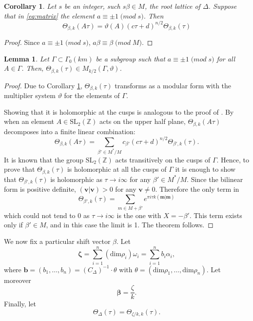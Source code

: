 \documentclass[11pt,a4paper]{amsart}
\newtheorem{lemma}[theorem]{Lemma}
\newtheorem{corollary}[theorem]{Corollary}
\theoremstyle{definition}
\newcommand{\SZ}{\mathbb{Z}}                    %
\begin{document}
\begin{corollary}
\label{cor:mult} Let $s$ be an integer, such $s\beta \in M$, the root lattice of $\Delta$.
Suppose that in \eqref{eq:matrix} the element $a \equiv \pm 1 \; \mathrm(mod\; s)$.
Then 
\[ \Theta_{\beta,k}(A\tau)= \vartheta(A)(c\tau+d)^{n/2} \Theta_{\beta,k}(\tau) \]
\end{corollary}
\begin{proof}
Since $a \equiv \pm 1 \; \mathrm(mod\; s)$, $a \beta \equiv \beta \; \mathrm(mod\; M)$.
\end{proof}
\begin{lemma} 
\label{lem:mult2}
Let $\Gamma \subset \Gamma_0(km)$ be a subgroup such that $a \equiv \pm 1 \; \mathrm(mod\; s)$ for all $A \in \Gamma$. Then, $\Theta_{\beta,k}(\tau) \in M_{k/2}(\Gamma, \vartheta)$.
\end{lemma}
\begin{proof} Due to Corollary \ref{cor:mult}, $\Theta_{\beta,k}(\tau)$ transforms as a modular form with the multiplier system $\vartheta$ for the elements of $\Gamma$. 

Showing that it is holomorphic at the cusps is analogous to the proof of \cite[Corollary 14.3.16]{cohen2017modular}. By \cite[Theorem 14.3.7]{cohen2017modular} when an element $A \in \textrm{SL}_2(\SZ)$ acts on the upper half plane, $\Theta_{\beta,k}(A\tau)$ decomposes into a finite linear combination:
\[ \Theta_{\beta,k}(A\tau)=\sum_{\beta' \in M^{\ast}/M}c_{\beta'}(c\tau+d)^{n/2}\Theta_{\beta',k}(\tau). \]
It is known that the group $\textrm{SL}_2(\SZ)$ acts transitively on the cusps of $\Gamma$.  Hence, to prove that $\Theta_{\beta,k}(\tau)$ is holomorphic at all the cusps of $\Gamma$ it is enough to show that $\Theta_{\beta',k}(\tau)$ is holomorphic as $\tau \to i\infty$ for any $\beta' \in M^{\ast}/M$. Since the bilinear form is positive definite, $(\mathbf{v}|\mathbf{v})>0$ for any $\mathbf{v} \neq 0$. Therefore the only term in
\[\Theta_{\beta',k}(\tau)= \sum_{m \in M+\beta'} e^{\pi i \tau k (\mathbf{m} | \mathbf{m})}\]
which could not tend to 0  as $\tau \to i\infty$ is the one with $X=-\beta'$. This term exists only if $\beta' \in M$, and in this case the limit is 1. The theorem follows.
\end{proof}


We now fix a particular shift vector $\beta$. Let
\begin{equation}\mathbf{\zeta}= \sum_{i=1}^n (\mathrm{dim} \rho_i) \omega_i=\sum_{i=1}^n b_i \alpha_i, 
\label{eq:zetasub}
\end{equation}
where $\mathbf{b}=(b_1,\dots,b_n)=(C_\Delta)^{-1} \cdot \theta$ with $\theta=( \mathrm{dim} \rho_1 ,\dots, \mathrm{dim} \rho_n)$.
Let moreover 
\begin{equation}\mathbf{\beta}= \frac{\zeta}{k}. 
\label{eq:betasub}
\end{equation}
Finally, let
\[ \Theta_{\Delta}(\tau)=\Theta_{\zeta/k,k}(\tau). \]
\end{document}
